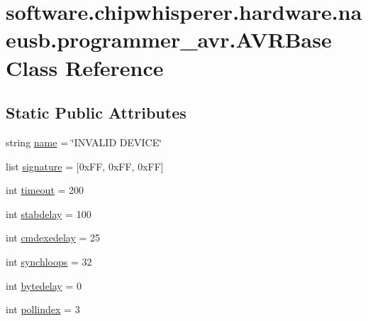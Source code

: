 \hypertarget{classsoftware_1_1chipwhisperer_1_1hardware_1_1naeusb_1_1programmer__avr_1_1AVRBase}{}\section{software.\+chipwhisperer.\+hardware.\+naeusb.\+programmer\+\_\+avr.\+A\+V\+R\+Base Class Reference}
\label{classsoftware_1_1chipwhisperer_1_1hardware_1_1naeusb_1_1programmer__avr_1_1AVRBase}
\subsection*{Static Public Attributes}
\begin{DoxyCompactItemize}
\item 
string \hyperlink{classsoftware_1_1chipwhisperer_1_1hardware_1_1naeusb_1_1programmer__avr_1_1AVRBase_af15f7f658b5661c34c1e32514db127b2}{name} = \char`\"{}I\+N\+V\+A\+L\+I\+D D\+E\+V\+I\+C\+E\char`\"{}
\item 
list \hyperlink{classsoftware_1_1chipwhisperer_1_1hardware_1_1naeusb_1_1programmer__avr_1_1AVRBase_a398a4d600ff1c2713fc3685b10797d11}{signature} = \mbox{[}0x\+F\+F, 0x\+F\+F, 0x\+F\+F\mbox{]}
\item 
int \hyperlink{classsoftware_1_1chipwhisperer_1_1hardware_1_1naeusb_1_1programmer__avr_1_1AVRBase_a9c709727efbca87100cdfa5c95fc6a22}{timeout} = 200
\item 
int \hyperlink{classsoftware_1_1chipwhisperer_1_1hardware_1_1naeusb_1_1programmer__avr_1_1AVRBase_a46d59905ac47fec2693c6a21cfa905d7}{stabdelay} = 100
\item 
int \hyperlink{classsoftware_1_1chipwhisperer_1_1hardware_1_1naeusb_1_1programmer__avr_1_1AVRBase_a0855277072f4f0025754f8d20ee1922d}{cmdexedelay} = 25
\item 
int \hyperlink{classsoftware_1_1chipwhisperer_1_1hardware_1_1naeusb_1_1programmer__avr_1_1AVRBase_a4975f3c6629c4fed95aa8102316e61a8}{synchloops} = 32
\item 
int \hyperlink{classsoftware_1_1chipwhisperer_1_1hardware_1_1naeusb_1_1programmer__avr_1_1AVRBase_a03ff20cee4af5e4835cbc95d0f713848}{bytedelay} = 0
\item 
int \hyperlink{classsoftware_1_1chipwhisperer_1_1hardware_1_1naeusb_1_1programmer__avr_1_1AVRBase_a55a6e872347668de0f7b20cd833d8bcc}{pollindex} = 3
\item 

\end{DoxyCompactItemize}
